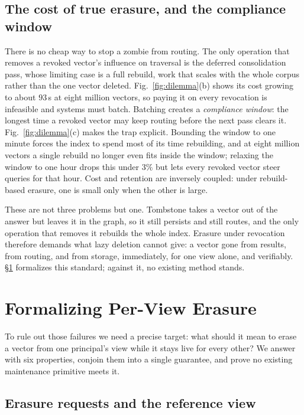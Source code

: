 \documentclass[sigconf, nonacm, review]{acmart}
\begin{document}
\subsection{The cost of true erasure, and the compliance window}
There is no cheap way to stop a zombie from routing. The only operation that
removes a revoked vector's influence on traversal is the deferred
consolidation pass, whose limiting case is a full rebuild, work that scales
with the whole corpus rather than the one vector deleted.
Fig.~\ref{fig:dilemma}(b) shows its cost growing to about $93$\,s at eight
million vectors, so paying it on every
revocation is infeasible and systems must batch.
Batching creates a \emph{compliance window}: the longest time a revoked
vector may keep routing before the next pass clears it.
Fig.~\ref{fig:dilemma}(c) makes the trap explicit. Bounding the
window to one minute forces the index to spend most of its time rebuilding,
and at eight million vectors a single rebuild no longer even fits inside the
window; relaxing the window to one hour drops this under $3\%$ but lets
every revoked vector steer queries for that hour. Cost and retention are inversely coupled: under rebuild-based
erasure, one is small only when the other is large.


These are not three problems but one. Tombstone takes a vector out of the
answer but leaves it in the graph, so it still persists and still routes, and
the only operation that removes it rebuilds the whole index.
Erasure under revocation therefore demands what lazy deletion cannot give: a
vector gone from results, from routing, and from storage, immediately, for one
view alone, and verifiably. \S\ref{sec:formal} formalizes this standard;
against it, no existing method stands.

\section{Formalizing Per-View Erasure}
\label{sec:formal}

To rule out those failures we need a precise target: what should it mean to
erase a vector from one principal's view while it stays live for every other?
We answer with six properties, conjoin them into a single guarantee, and prove
no existing maintenance primitive meets it.

\subsection{Erasure requests and the reference view}
\end{document}

